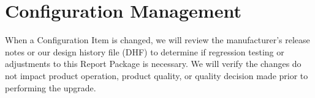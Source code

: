 \section{Configuration Management}
When a Configuration Item is changed, we will review the manufacturer's release
notes or our design history file (DHF) to determine if regression testing or
adjustments to this Report Package is necessary. We will verify the changes do
not impact product operation, product quality, or quality decision made prior
to performing the upgrade.
